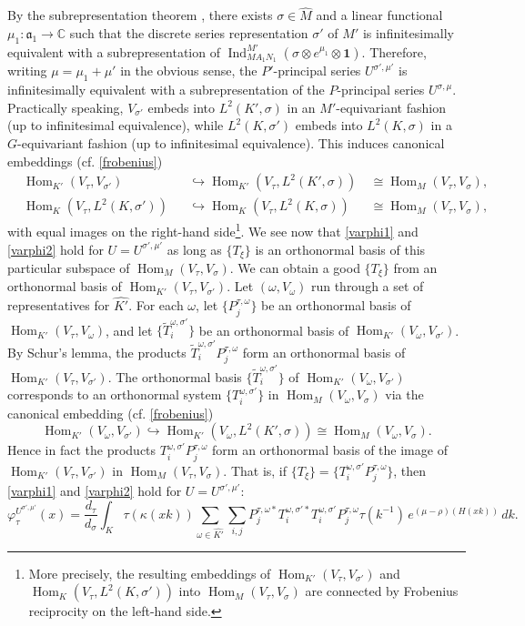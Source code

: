 \documentclass[11pt,oneside]{amsart}
\numberwithin{equation}{section}
\theoremstyle{remark}
\theoremstyle{plain}
\DeclareMathOperator{\Hom}{Hom}
\DeclareMathOperator{\Ind}{Ind}
\newcommand\CC{\mathbb{C}}
\newcommand\mfa{\mathfrak{a}}
\begin{document}
By the subrepresentation theorem \cite[Th.~8.21]{CM}, there exists $\sigma\in\widehat{M}$ and a linear functional $\mu_1:\mfa_1\to\CC$ such that the discrete series representation $\sigma'$ of $M'$ is infinitesimally equivalent with a subrepresentation of $\Ind_{MA_1N_1}^{M'}(\sigma\otimes e^{\mu_1}\otimes\mathbf{1})$. Therefore, writing $\mu=\mu_1+\mu'$ in the obvious sense, the $P'$-principal series $U^{\sigma',\mu'}$ is infinitesimally equivalent with a subrepresentation of the $P$-principal series $U^{\sigma,\mu}$. Practically speaking, $V_{\sigma'}$ embeds into $L^2(K',\sigma)$ in an $M'$-equivariant fashion (up to infinitesimal equivalence), while $L^2(K,\sigma')$ embeds into $L^2(K,\sigma)$ in a $G$-equivariant fashion (up to infinitesimal equivalence). This induces canonical embeddings (cf. \eqref{frobenius})
\[\begin{alignedat}{3}
&\Hom_{K'}(V_\tau,V_{\sigma'})&&\hookrightarrow\Hom_{K'}(V_\tau,L^2(K',\sigma))\ &\cong\Hom_M(V_\tau,V_\sigma),\\
&\Hom_K(V_\tau,L^2(K,\sigma'))&&\hookrightarrow\Hom_K(V_\tau,L^2(K,\sigma))&\cong\Hom_M(V_\tau,V_\sigma),
\end{alignedat}\]
with equal images on the right-hand side\footnote{More precisely, the resulting embeddings of $\Hom_{K'}(V_\tau,V_{\sigma'})$ and $\Hom_K(V_\tau,L^2(K,\sigma'))$ into $\Hom_M(V_\tau,V_\sigma)$ are connected by Frobenius reciprocity on the left-hand side.}. We see now that \eqref{varphi1} and \eqref{varphi2} hold for $U=U^{\sigma',\mu'}$ as long as $\{T_\xi\}$ is an orthonormal basis of this particular subspace of $\Hom_M(V_\tau,V_\sigma)$. We can obtain a good $\{T_\xi\}$ from an orthonormal basis of $\Hom_{K'}(V_\tau,V_{\sigma'})$. Let $(\omega,V_\omega)$ run through a set of representatives for $\widehat{K'}$. For each $\omega$, let $\{P_j^{\tau,\omega}\}$ be an orthonormal basis of $\Hom_{K'}(V_\tau,V_\omega)$, and let $\{\widetilde{T}_i^{\omega,\sigma'}\}$ be an orthonormal basis of $\Hom_{K'}(V_\omega,V_{\sigma'})$. By Schur's lemma, the products $\widetilde{T}_i^{\omega,\sigma'}P_j^{\tau,\omega}$ form an orthonormal basis of 
$\Hom_{K'}(V_\tau,V_{\sigma'})$. The orthonormal basis $\{\widetilde{T}_i^{\omega,\sigma'}\}$ of $\Hom_{K'}(V_\omega,V_{\sigma'})$ corresponds to an orthonormal system $\{T_i^{\omega,\sigma'}\}$ in $\Hom_M(V_\omega,V_\sigma)$ via the canonical embedding (cf. \eqref{frobenius}) 
\[\Hom_{K'}(V_\omega,V_{\sigma'})\hookrightarrow\Hom_{K'}(V_\omega,L^2(K',\sigma))\cong\Hom_M(V_\omega,V_\sigma).\]
Hence in fact the products $T_i^{\omega,\sigma'}P_j^{\tau,\omega}$ form an orthonormal basis of the image of $\Hom_{K'}(V_\tau,V_{\sigma'})$ in $\Hom_M(V_\tau,V_\sigma)$. That is, if $\{T_\xi\}=\{T_i^{\omega,\sigma'}P_j^{\tau,\omega}\}$, then \eqref{varphi1} and \eqref{varphi2} hold for $U=U^{\sigma',\mu'}$:
\begin{equation}\label{Eis2}
\varphi_\tau^{U^{\sigma',\mu'}}(x)=\frac{d_\tau}{d_\sigma}\int_K\tau(\kappa(xk))
\sum_{\omega\in\widehat{K'}}\sum_{i,j}P_j^{\tau,\omega*}T_i^{\omega,\sigma'*}T_i^{\omega,\sigma'}P_j^{\tau,\omega}
\tau(k^{-1})\,e^{(\mu-\rho)(H(xk))}\,dk.
\end{equation}
\end{document}
